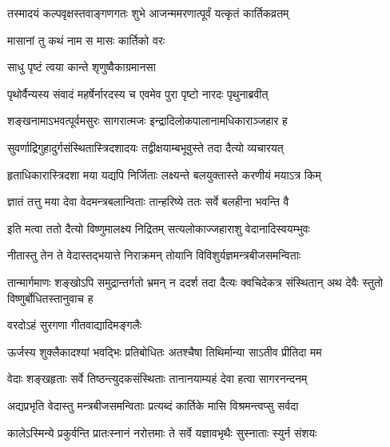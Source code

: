 \twolineshloka
{तस्मादयं कल्पवृक्षस्तवाङ्गणगतः शुभे}
{आजन्ममरणात्पूर्वं यत्कृतं कार्तिकव्रतम्} %




\onelineshloka
{मासानां तु कथं नाम स मासः कार्तिको वरः} %




\onelineshloka
{साधु पृष्टं त्वया कान्ते शृणुष्वैकाग्रमानसा} %

\twolineshloka
{पृथोर्वैन्यस्य संवादं महर्षेर्नारदस्य च}
{एवमेव पुरा पृष्टो नारदः पृथुनाब्रवीत्} %


\twolineshloka
{शङ्खनामाऽभवत्पूर्वमसुरः सागरात्मजः}
{इन्द्रादिलोकपालानामधिकाराञ्जहार ह} %

\twolineshloka
{सुवर्णाद्रिगुहादुर्गसंस्थितास्त्रिदशादयः}
{तद्वीक्षयाम्बभूवुस्ते तदा दैत्यो व्यचारयत्} %

\twolineshloka
{हृताधिकारास्त्रिदशा मया यद्यपि निर्जिताः}
{लक्ष्यन्ते बलयुक्तास्ते करणीयं मयाऽत्र किम्} %

\twolineshloka
{ज्ञातं तत्तु मया देवा वेदमन्त्रबलान्विताः}
{तान्हरिष्ये ततः सर्वे बलहीना भवन्ति वै} %

\twolineshloka
{इति मत्वा ततो दैत्यो विष्णुमालक्ष्य निद्रितम्}
{सत्यलोकाज्जहाराशु वेदानादिस्वयम्भुवः} %

\twolineshloka
{नीतास्तु तेन ते वेदास्तद्भयात्ते निराक्रमन्}
{तोयानि विविशुर्यज्ञमन्त्रबीजसमन्विताः} %

\threelineshloka
{तान्मार्गमाणः शङ्खोऽपि समुद्रान्तर्गतो भ्रमन्}
{न ददर्श तदा दैत्यः क्वचिदेकत्र संस्थितान्}
{अथ देवैः स्तुतो विष्णुर्बोधितस्तानुवाच ह} %



\onelineshloka
{वरदोऽहं सुरगणा गीतवाद्यादिमङ्गलैः} %

\twolineshloka
{ऊर्जस्य शुक्लैकादश्यां भवद्भिः प्रतिबोधितः}
{अतश्चैषा तिथिर्मान्या साऽतीव प्रीतिदा मम} %

\twolineshloka
{वेदाः शङ्खहृताः सर्वे तिष्ठन्त्युदकसंस्थिताः}
{तानानयाम्यहं देवा हत्वा सागरनन्दनम्} %

\twolineshloka
{अद्यप्रभृति वेदास्तु मन्त्रबीजसमन्विताः}
{प्रत्यब्दं कार्तिके मासि विश्रमन्त्वप्सु सर्वदा} %

\twolineshloka
{कालेऽस्मिन्ये प्रकुर्वन्ति प्रातःस्नानं नरोत्तमाः}
{ते सर्वे यज्ञावभृथैः सुस्नाताः स्युर्न संशयः} %


